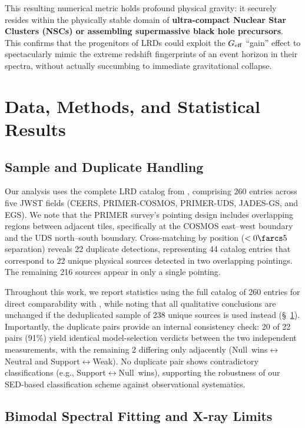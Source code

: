 \documentclass[twocolumn]{aastex631}
\begin{document}
This resulting numerical metric holds profound physical gravity: it securely resides within the physically stable domain of \textbf{ultra-compact Nuclear Star Clusters (NSCs) or assembling supermassive black hole precursors}. This confirms that the progenitors of LRDs could exploit the $G_{\rm eff}$ ``gain'' effect to spectacularly mimic the extreme redshift fingerprints of an event horizon in their spectra, without actually succumbing to immediate gravitational collapse.

\section{Data, Methods, and Statistical Results} \label{sec:results}

\subsection{Sample and Duplicate Handling}

Our analysis uses the complete LRD catalog from \citet{Kokorev2024}, comprising 260 entries across five JWST fields (CEERS, PRIMER-COSMOS, PRIMER-UDS, JADES-GS, and EGS). We note that the PRIMER survey's pointing design includes overlapping regions between adjacent tiles, specifically at the COSMOS east--west boundary and the UDS north--south boundary. Cross-matching by position ($<0\farcs5$ separation) reveals 22 duplicate detections, representing 44 catalog entries that correspond to 22 unique physical sources detected in two overlapping pointings. The remaining 216 sources appear in only a single pointing.

Throughout this work, we report statistics using the full catalog of 260 entries for direct comparability with \citet{Kokorev2024}, while noting that all qualitative conclusions are unchanged if the deduplicated sample of 238 unique sources is used instead (\S~\ref{sec:results}). Importantly, the duplicate pairs provide an internal consistency check: 20 of 22 pairs (91\%) yield identical model-selection verdicts between the two independent measurements, with the remaining 2 differing only adjacently (Null~wins$\leftrightarrow$Neutral and Support$\leftrightarrow$Weak). No duplicate pair shows contradictory classifications (e.g., Support$\leftrightarrow$Null~wins), supporting the robustness of our SED-based classification scheme against observational systematics.

\subsection{Bimodal Spectral Fitting and X-ray Limits}
\end{document}
